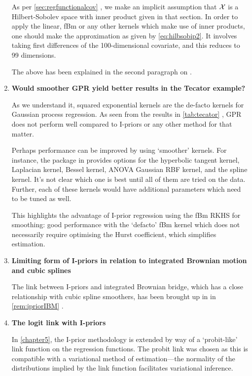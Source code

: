 \documentclass[11pt,showframe,twoside,openright]{report}
\begin{document}
\begin{enumerate}
  As per \cref{sec:regfunctionalcov} , we make an implicit assumption that ${\mathcal X}$ is a Hilbert-Sobolev space with inner product given in that section.
  In order to apply the linear, fBm or any other kernels which make use of inner products, one should make the approximation as given by \cref{eq:hilbsobip2}.
  It involves taking first differences of the 100-dimensional covariate, and this reduces to 99 dimensions.
  
  The above has been explained in the second paragraph on .

  \item \textbf{Would smoother GPR yield better results in the Tecator example?}

  As we understand it, squared exponential kernels are the de-facto kernels for Gaussian process regression.
  As seen from the results in \cref{tab:tecator} , GPR does not perform well compared to I-priors or any other method for that matter.
  
  Perhaps performance can be improved by using `smoother' kernels.
  For instance, the  package in  provides options for the hyperbolic tangent kernel, Laplacian kernel, Bessel kernel, ANOVA Gaussian RBF kernel, and the spline kernel.
  It's not clear which one is best until all of them are tried on the data.
  Further, each of these kernels would have additional parameters which need to be tuned as well.
  
  This highlights the advantage of I-prior regression using the fBm RKHS for smoothing: good performance with the `defacto' fBm kernel which does not necessarily require optimising the Hurst coefficient, which simplifies estimation.
  
  
  \item \textbf{Limiting form of I-priors in relation to integrated Brownian motion and cubic splines}

  The link between I-priors and integrated Brownian bridge, which has a close relationship with cubic spline smoothers, has been brought up in in \cref{rem:ipriorIBM} .

  \item \textbf{The logit link with I-priors}
  
  In \cref{chapter5}, the I-prior methodology is extended by way of a `probit-like' link function on the regression functions. 
  The probit link was chosen as this is compatible with a variational method of estimation---the normality of the distributions implied by the link function facilitates variational inference.
  

\end{enumerate}
\end{document}
